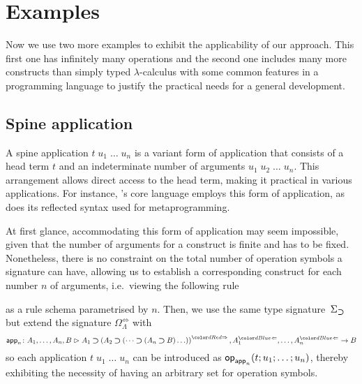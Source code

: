 
\section{Examples}\label{sec:example}
Now we use two more examples to exhibit the applicability of our approach.
This first one has infinitely many operations and the second one includes many more constructs than simply typed $\lambda$-calculus with some common features in a programming language to justify the practical needs for a general development.

\subsection{Spine application}\label{subsec:spine}
A spine application $t\;u_1\;\ldots\;u_n$ is a variant form of application that consists of a head term $t$ and an indeterminate number of arguments $u_1\;u_2\;\dots\;u_n$.
This arrangement allows direct access to the head term, making it practical in various applications.
For instance, \Agda's core language employs this form of application, as does its reflected syntax used for metaprogramming.

At first glance, accommodating this form of application may seem impossible, given that the number of arguments for a construct is finite and has to be fixed.
Nonetheless, there is no constraint on the total number of operation symbols a signature can have, allowing us to establish a corresponding construct for each number $n$ of arguments, i.e.\ viewing the following rule
\bgroup
\small
  \begin{mathpar}
  \end{mathpar}
\egroup
as a rule schema parametrised by $n$.
Then, we use the same type signature~$\Sigma_{\bto}$ but extend the signature $\Omega_{\Lambda}^{\Leftrightarrow}$ with 
\[
  \aritysymbol{\mathsf{app}_n}{A_1,\ldots, A_n, B}{A_1 \bto \left(A_2 \bto \left(\dots \bto \left(A_n \bto B\right)\ldots\right)\right)^{\syn}, A_1^{\chk}, \ldots, A_n^{\chk}}{B}
\]
so each application $t\;u_1\;\ldots\;u_n$ can be introduced as $\tmOp_{\mathsf{app}_n}(t; u_1; \ldots; u_n)$, thereby exhibiting the necessity of having an arbitrary set for operation symbols.

